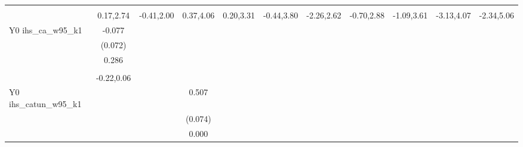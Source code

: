 \begin{table}[!h]
\begin{adjustbox}{width=\columnwidth,center}
\begin{tabular}{l*{8}{c}}
                    &                     &                     &                     &                     &                     &                     &                     &                     &                     &                     \\
                    &   0.17,2.74         &  -0.41,2.00         &   0.37,4.06         &   0.20,3.31         &  -0.44,3.80         &  -2.26,2.62         &  -0.70,2.88         &  -1.09,3.61         &  -3.13,4.07         &  -2.34,5.06         \\
Y0 ihs\_ca\_w95\_k1    &      -0.077         &                     &                     &                     &                     &                     &                     &                     &                     &                     \\
                    &     (0.072)         &                     &                     &                     &                     &                     &                     &                     &                     &                     \\
                    &       0.286         &                     &                     &                     &                     &                     &                     &                     &                     &                     \\
                    &                     &                     &                     &                     &                     &                     &                     &                     &                     &                     \\
                    &  -0.22,0.06         &                     &                     &                     &                     &                     &                     &                     &                     &                     \\
Y0 ihs\_catun\_w95\_k1 &                     &                     &       0.507\sym{***}&                     &                     &                     &                     &                     &                     &                     \\
                    &                     &                     &     (0.074)         &                     &                     &                     &                     &                     &                     &                     \\
                    &                     &                     &       0.000         &                     &                     &                     &                     &                     &                     &                     \\

\end{tabular}
\end{adjustbox}
\end{table}
